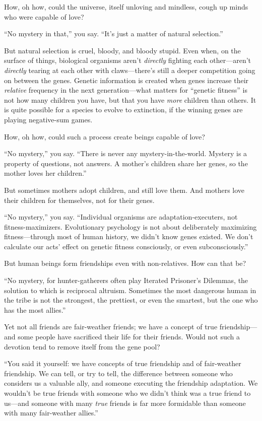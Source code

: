 {
 How, oh how, could the universe, itself unloving and mindless,
cough up minds who were capable of love? }

{
 ``No mystery in that,'' you
say. ``It's just a matter of natural
selection.''}

{
 But natural selection is cruel, bloody, and bloody stupid. Even
when, on the surface of things, biological organisms
aren't \textit{directly} fighting each
other---aren't \textit{directly} tearing at each other
with claws---there's still a deeper competition going
on between the genes. Genetic information is created when genes
increase their \textit{relative} frequency in the next
generation---what matters for ``genetic
fitness'' is not how many children you have, but that
you have \textit{more} children than others. It is quite possible for a
species to evolve to extinction, if the winning genes are playing
negative-sum games.}

{
 How, oh how, could such a process create beings capable of love?}

{
 ``No mystery,'' you say.
``There is never any mystery-in-the-world. Mystery is
a property of questions, not answers. A mother's
children share her genes, so the mother loves her
children.''}

{
 But sometimes mothers adopt children, and still love them. And
mothers love their children for themselves, not for their genes.}

{
 ``No mystery,'' you say.
``Individual organisms are adaptation-executers, not
fitness-maximizers. Evolutionary psychology is not about deliberately
maximizing fitness---through most of human history, we
didn't know genes existed. We don't
calculate our acts' effect on genetic fitness
consciously, or even subconsciously.''}

{
 But human beings form friendships even with non-relatives. How can
that be?}

{
 ``No mystery, for hunter-gatherers often play
Iterated Prisoner's Dilemmas, the solution to which is
reciprocal altruism. Sometimes the most dangerous human in the tribe is
not the strongest, the prettiest, or even the smartest, but the one who
has the most allies.''}

{
 Yet not all friends are fair-weather friends; we have a concept of
true friendship---and some people have sacrificed their life for their
friends. Would not such a devotion tend to remove itself from the gene
pool?}

{
 ``You said it yourself: we have concepts of true
friendship and of fair-weather friendship. We can tell, or try to tell,
the difference between someone who considers us a valuable ally, and
someone executing the friendship adaptation. We
wouldn't be true friends with someone who we
didn't think was a true friend to us---and someone with
many \textit{true} friends is far more formidable than someone with
many fair-weather allies.''}

